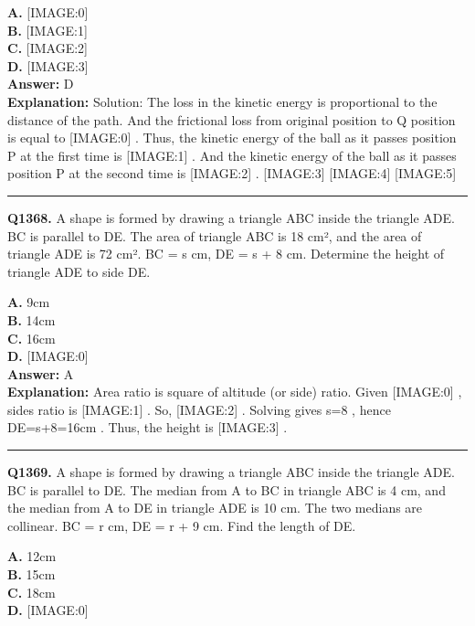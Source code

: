 \documentclass[12pt]{article}
\begin{document}
\textbf{A.} [IMAGE:0] \\
\textbf{B.} [IMAGE:1] \\
\textbf{C.} [IMAGE:2] \\
\textbf{D.} [IMAGE:3] \\

\textbf{Answer:} D \\
\textbf{Explanation:} Solution:
The loss in the kinetic energy is proportional to the distance of the path. And the frictional loss from original position to Q position is equal to
[IMAGE:0]
. Thus, the kinetic energy of the ball as it passes position P at the first time is
[IMAGE:1]
. And the kinetic energy of the ball as it passes position P at the second time is
[IMAGE:2]
.
[IMAGE:3]
[IMAGE:4]
[IMAGE:5]

\hrule
\vspace{1em}


\noindent
\textbf{Q1368.} A shape is formed by drawing a triangle ABC inside the triangle ADE. BC is parallel to DE. The area of triangle ABC is 18 cm², and the area of triangle ADE is 72 cm². BC = s cm, DE = s + 8 cm.
Determine the height of triangle ADE to side DE.



\textbf{A.} 9cm \\
\textbf{B.} 14cm \\
\textbf{C.} 16cm \\
\textbf{D.} [IMAGE:0] \\

\textbf{Answer:} A \\
\textbf{Explanation:} Area ratio is square of altitude (or side) ratio. Given
[IMAGE:0]
, sides ratio is
[IMAGE:1]
. So,
[IMAGE:2]
. Solving gives s=8
, hence DE=s+8=16cm
. Thus, the height is
[IMAGE:3]
.

\hrule
\vspace{1em}


\noindent
\textbf{Q1369.} A shape is formed by drawing a triangle ABC inside the triangle ADE. BC is parallel to DE. The median from A to BC in triangle ABC is 4 cm, and the median from A to DE in triangle ADE is 10 cm. The two medians are collinear. BC = r cm, DE = r + 9 cm.
Find the length of DE.



\textbf{A.} 12cm \\
\textbf{B.} 15cm \\
\textbf{C.} 18cm \\
\textbf{D.} [IMAGE:0] \\
\end{document}
